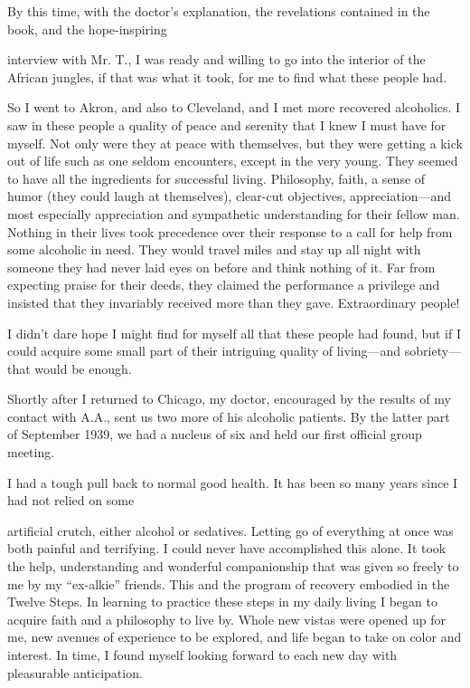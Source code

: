 \begin{biblechapter}
By this time, with the doctor’s explanation, the revelations contained in the book, and the hope-inspiring

interview with Mr. T., I was ready and willing to go into the interior of the African jungles, if that was what it took, for me to find what these people had.

So I went to Akron, and also to Cleveland, and I met more recovered alcoholics. I saw in these people a quality of peace and serenity that I knew I must have for myself. Not only were they at peace with themselves, but they were getting a kick out of life such as one seldom encounters, except in the very young. They seemed to have all the ingredients for successful living. Philosophy, faith, a sense of humor (they could laugh at themselves), clear-cut objectives, appreciation—and most especially appreciation and sympathetic understanding for their fellow man. Nothing in their lives took precedence over their response to a call for help from some alcoholic in need. They would travel miles and stay up all night with someone they had never laid eyes on before and think nothing of it. Far from expecting praise for their deeds, they claimed the performance a privilege and insisted that they invariably received more than they gave. Extraordinary people!

I didn’t dare hope I might find for myself all that these people had found, but if I could acquire some small part of their intriguing quality of living—and sobriety—that would be enough.

Shortly after I returned to Chicago, my doctor, encouraged by the results of my contact with A.A., sent us two more of his alcoholic patients. By the latter part of September 1939, we had a nucleus of six and held our first official group meeting.

I had a tough pull back to normal good health. It has been so many years since I had not relied on some

artificial crutch, either alcohol or sedatives. Letting go of everything at once was both painful and terrifying. I could never have accomplished this alone. It took the help, understanding and wonderful companionship that was given so freely to me by my “ex-alkie” friends. This and the program of recovery embodied in the Twelve Steps. In learning to practice these steps in my daily living I began to acquire faith and a philosophy to live by. Whole new vistas were opened up for me, new avenues of experience to be explored, and life began to take on color and interest. In time, I found myself looking forward to each new day with pleasurable anticipation.


\end{biblechapter}
